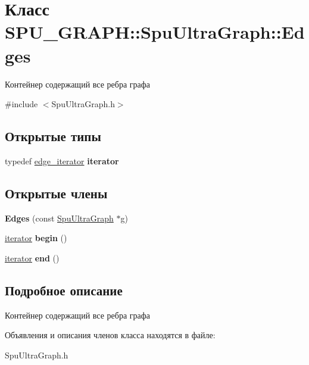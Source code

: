 \hypertarget{class_s_p_u___g_r_a_p_h_1_1_spu_ultra_graph_1_1_edges}{}\section{Класс S\+P\+U\+\_\+\+G\+R\+A\+PH\+:\+:Spu\+Ultra\+Graph\+:\+:Edges}
\label{class_s_p_u___g_r_a_p_h_1_1_spu_ultra_graph_1_1_edges}


Контейнер содержащий все ребра графа  




{\ttfamily \#include $<$Spu\+Ultra\+Graph.\+h$>$}

\subsection*{Открытые типы}
\begin{DoxyCompactItemize}
\item 
\mbox{\label{class_s_p_u___g_r_a_p_h_1_1_spu_ultra_graph_1_1_edges_ac1ca1082fcec48528a49b2cbd2306892}} 
typedef \hyperlink{class_s_p_u___g_r_a_p_h_1_1_spu_ultra_graph_abf3933dd7a8c18410837fee58a8a8a10}{edge\+\_\+iterator} {\bfseries iterator}
\end{DoxyCompactItemize}
\subsection*{Открытые члены}
\begin{DoxyCompactItemize}
\item 
\mbox{\label{class_s_p_u___g_r_a_p_h_1_1_spu_ultra_graph_1_1_edges_aeea766c667e0ccdce1c2bdccb0aa52d9}} 
{\bfseries Edges} (const \hyperlink{class_s_p_u___g_r_a_p_h_1_1_spu_ultra_graph}{Spu\+Ultra\+Graph} $\ast$g)
\item 
\mbox{\label{class_s_p_u___g_r_a_p_h_1_1_spu_ultra_graph_1_1_edges_ae1d28a5b50f8d3a09f30fd5a15da8581}} 
\hyperlink{class_s_p_u___g_r_a_p_h_1_1_spu_ultra_graph_1_1_edge_iterator}{iterator} {\bfseries begin} ()
\item 
\mbox{\label{class_s_p_u___g_r_a_p_h_1_1_spu_ultra_graph_1_1_edges_abc2cc6d2223e45627e6a9539f289af80}} 
\hyperlink{class_s_p_u___g_r_a_p_h_1_1_spu_ultra_graph_1_1_edge_iterator}{iterator} {\bfseries end} ()
\end{DoxyCompactItemize}


\subsection{Подробное описание}
Контейнер содержащий все ребра графа 

Объявления и описания членов класса находятся в файле\+:\begin{DoxyCompactItemize}
\item 
Spu\+Ultra\+Graph.\+h\end{DoxyCompactItemize}
